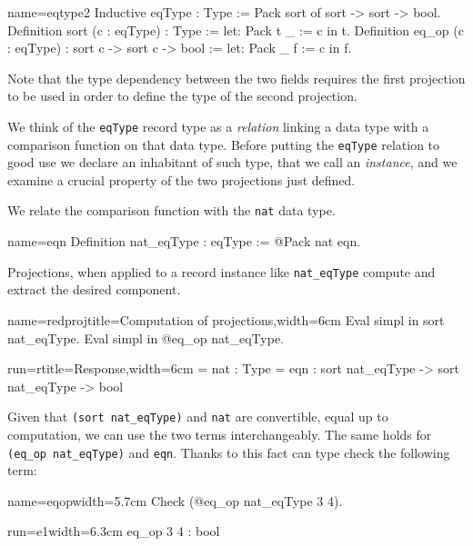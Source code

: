\begin{coq}{name=eqtype2}{}
Inductive eqType : Type :=
  Pack sort of sort -> sort -> bool.
Definition sort (c : eqType) : Type :=
  let: Pack t _ := c in t.
Definition eq_op (c : eqType) : sort c -> sort c -> bool :=
  let: Pack _ f := c in f.
\end{coq}

Note that the type dependency between the two fields requires the first
projection to be used in order to define the type of the second projection.

We think of the \lstinline/eqType/ record type as a \emph{relation}
linking a
data type with a comparison function on that data type.  Before
putting the \lstinline/eqType/ relation to good use we declare an
inhabitant of such type, that we call an \emph{instance}, and we
examine a crucial property of the two projections just defined.

We relate the  comparison function with the \lstinline/nat/
data type.

\begin{coq}{name=eqn}{}
Definition nat_eqType : eqType := @Pack nat eqn.
\end{coq}

Projections, when applied to a record instance like
\lstinline/nat_eqType/ compute and extract the desired component.

\begin{coq-left}{name=redproj}{title=Computation of projections,width=6cm}
Eval simpl in sort nat_eqType.
Eval simpl in @eq_op nat_eqType.
\end{coq-left}
\begin{coqout-right}{run=r}{title=Response,width=6cm}
= nat : Type
= eqn : sort nat_eqType ->
         sort nat_eqType -> bool
\end{coqout-right}

Given that \lstinline/(sort nat_eqType)/ and \lstinline/nat/
are convertible, equal up to computation, we can use the two terms
interchangeably.  The same holds for \lstinline/(eq_op nat_eqType)/
and \lstinline/eqn/.  Thanks to this fact \Coq{} can type check the
following term:

\begin{coq-left}{name=eqop}{width=5.7cm}
Check (@eq_op nat_eqType 3 4).
\end{coq-left}
\begin{coqout-right}{run=e1}{width=6.3cm}
eq_op 3 4 : bool
\end{coqout-right}

